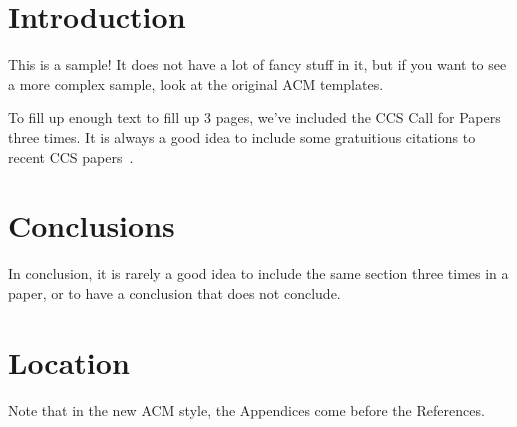 \section{Introduction}

This is a sample!  It does not have a lot of fancy stuff in it, but if
you want to see a more complex sample, look at the original ACM
templates.

To fill up enough text to fill up 3 pages, we've included the CCS Call
for Papers three times.  It is always a good idea to include some
gratuitious citations to recent CCS papers~\cite{medvinsky1993netcash,
  bellare1993random, anderson1993cryptosystems, blaze1993cryptographic}.





\section{Conclusions}

In conclusion, it is rarely a good idea to include the same section three times in a paper, or to have a conclusion that does not conclude.

\appendix

\section{Location}

Note that in the new ACM style, the Appendices come before the References.



\begin{acks}
\end{acks}
